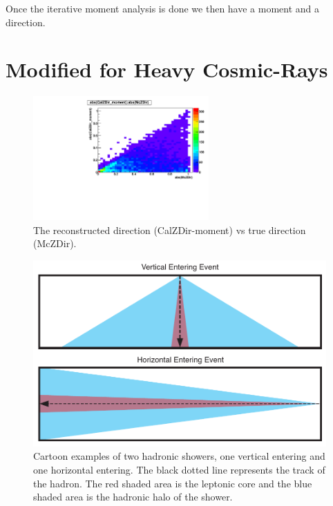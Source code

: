 \documentclass[11pt]{article}
\begin{document}
Once the iterative moment analysis is done we then have a moment and a direction.  

\section{Modified for Heavy Cosmic-Rays}

\begin{figure}
  \begin{center}
    \includegraphics[width=0.6\textwidth]{McvsMoment}
  \end{center}
  \caption{The reconstructed direction (CalZDir-moment) vs true direction (McZDir).  }
  \label{McVsMoment}
\end{figure}

\begin{figure}[h!]
  \includegraphics{showers.pdf}
  \caption{Cartoon examples of two hadronic showers, one vertical entering and one horizontal entering.  The black dotted line represents the track of the hadron.  The red shaded area is the leptonic core and the blue shaded area is the hadronic halo of the shower.}
  \label{showers}
\end{figure}
\end{document}
